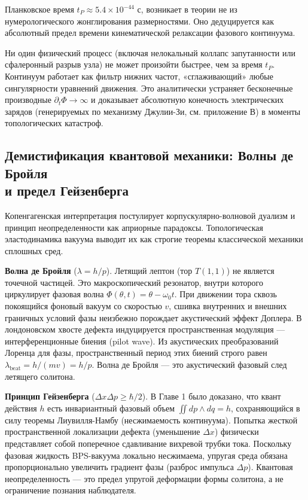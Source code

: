 \documentclass[11pt,a4paper]{article}
\begin{document}
	Планковское время $t_P \approx 5.4\times10^{-44}$ с, возникает в теории не из нумерологического жонглирования размерностями. Оно дедуцируется как абсолютный предел времени кинематической релаксации фазового континуума.
	
	Ни один физический процесс (включая нелокальный коллапс запутанности или сфалеронный разрыв узла) не может произойти быстрее, чем за время $t_P$. Континуум работает как фильтр нижних частот, «сглаживающий» любые сингулярности уравнений движения. Это аналитически устраняет бесконечные производные $\partial_t \Phi \to \infty$ и доказывает абсолютную конечность электрических зарядов (генерируемых по механизму Джулии-Зи, см. приложение В) в моменты топологических катастроф.
	
	\subsection{Демистификация квантовой механики: Волны де Бройля\\ и предел Гейзенберга}
	Копенгагенская интерпретация постулирует корпускулярно-волновой дуализм и принцип неопределенности как априорные парадоксы. Топологическая эластодинамика вакуума выводит их как строгие теоремы классической механики сплошных сред.
	
	\textbf{Волна де Бройля} ($\lambda = h/p$). Летящий лептон (тор $T(1,1)$) не является точечной частицей. Это макроскопический резонатор, внутри которого циркулирует фазовая волна $\Phi(\theta, t) = \theta - \omega_0 t$. При движении тора сквозь покоящийся фоновый вакуум со скоростью $v$, сшивка внутренних и внешних граничных условий фазы неизбежно порождает акустический эффект Доплера. В лондоновском хвосте дефекта индуцируется пространственная модуляция — интерференционные биения (pilot wave). Из акустических преобразований Лоренца для фазы, пространственный период этих биений строго равен $\lambda_{\text{beat}} = h / (mv) = h/p$. Волна де Бройля — это акустический фазовый след летящего солитона.
	
	\textbf{Принцип Гейзенберга} ($\Delta x \Delta p \ge \hbar/2$). В Главе 1 было доказано, что квант действия $h$ есть инвариантный фазовый объем $\iint dp \wedge dq = h$, сохраняющийся в силу теоремы Лиувилля-Намбу (несжимаемость континуума). Попытка жесткой пространственной локализации дефекта (уменьшение $\Delta x$) физически представляет собой поперечное сдавливание вихревой трубки тока. Поскольку фазовая жидкость BPS-вакуума локально несжимаема, упругая среда обязана пропорционально увеличить градиент фазы (разброс импульса $\Delta p$). Квантовая неопределенность — это предел упругой деформации формы солитона, а не ограничение познания наблюдателя.
	
\end{document}
